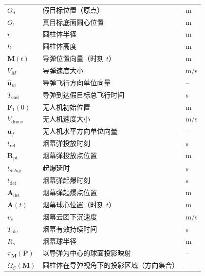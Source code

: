\documentclass{ctexart}
\begin{document}
\begin{longtable}{@{} p{2.8cm} p{6.5cm} p{1.8cm} @{}}
$O_d$          & 假目标位置（原点）                                 & m \\
$O_1$          & 真目标底面圆心位置                                     & m \\
$r$            & 圆柱体半径                                             & m \\
$h$            & 圆柱体高度                                             & m \\
$\mathbf{M}(t)$ & 导弹位置向量（时刻 $t$）                             & m \\
$V_M$          & 导弹速度大小                                           & m/s \\
$\hat{\mathbf{u}}_m$ & 导弹飞行方向单位向量                                   & -- \\
$T_{\text{end}}$ & 导弹到达假目标总飞行时间                             & s \\
$\mathbf{F}_1(0)$ & 无人机初始位置                                     & m \\
$V_{\text{drone}}$          & 无人机速度大小                                         & m/s \\
$\mathbf{u}_f$ & 无人机水平方向单位向量                                 & -- \\
$t_{\text{rel}}$ & 烟幕弹投放时刻                                     & s \\
$\mathbf{R}_\text{pt}$   & 烟幕弹投放点位置                                       & m \\
$t_{delay}$ & 起爆延时                                     & s \\
$t_{\text{det}}$ & 烟幕弹起爆时刻                                     & s \\
$\mathbf{A}_{\text{det}}$ & 烟幕弹起爆点位置                             & m \\
$\mathbf{A}(t)$ & 烟幕球心位置（时刻 $t$）                           & m \\
$v_s$          & 烟幕云团下沉速度                                       & m/s \\
$T_{\text{life}}$ & 烟幕有效持续时间                                   & s \\
$R_s$          & 烟幕球半径                                             & m \\
$\pi_{\mathbf{M}}(\mathbf{P})$ & 以导弹为中心的球面投影映射                   & -- \\
$\Omega_C(\mathbf{M})$ & 圆柱体在导弹视角下的投影区域（方向集合）     & -- \\

\end{longtable}
\end{document}
